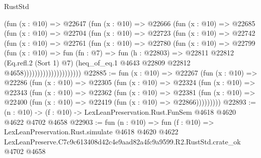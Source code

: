 \begin{lexlean}{RustStd}
\begin{coremodule}
                        (fun (x : @10) =>
                        @22647
                          (fun (x : @10) =>
                          @22666
                            (fun (x : @10) =>
                            @22685
                              (fun (x : @10) =>
                              @22704
                                (fun (x : @10) =>
                                @22723
                                  (fun (x : @10) =>
                                  @22742
                                    (fun (x : @10) =>
                                    @22761
                                      (fun (x : @10) =>
                                      @22780
                                        (fun (x : @10) =>
                                        @22799
                                          (fun (x : @10) =>
                                          fun (fn : @7) =>
                                          fun (h : @22803) =>
                                          @22811
                                            @22812
                                            (Eq.refl.{2} (Sort 1) @7)
                                            (heq_of_eq.{1}
                                              @4643
                                              @22809
                                              @22812
                                              @4658)))))))))))))))))))))
@22885 := fun (x : @10) =>
  @22267
    (fun (x : @10) =>
    @22286
      (fun (x : @10) =>
      @22305
        (fun (x : @10) =>
        @22324
          (fun (x : @10) =>
          @22343
            (fun (x : @10) =>
            @22362
              (fun (x : @10) =>
              @22381
                (fun (x : @10) => @22400 (fun (x : @10) => @22419 (fun (x : @10) => @22866)))))))))
@22893 := (n : @10) -> (f : @10) -> LexLeanPreservation.Rust.FunSem @4618 @4620 @4622 @4702 @4658
@22903 := fun (n : @10) =>
  fun (f : @10) =>
  LexLeanPreservation.Rust.simulate
    @4618
    @4620
    @4622
    LexLeanPreserve.C7c9c613408d42c4e9aad82a4fc9a9599.R2.RustStd.crate_ok
    @4702
    @4658
\end{coremodule}
\end{lexlean}
